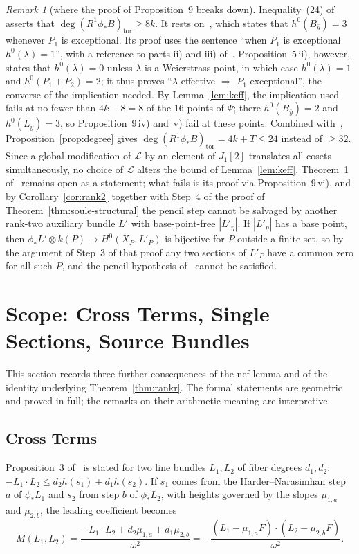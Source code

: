 \documentclass[11pt]{article}
\theoremstyle{definition}
\theoremstyle{remark}
\newtheorem{remark}[theorem]{Remark}
\newcommand{\cL}{\mathcal{L}}
\newcommand{\Lb}{\overline{L}}
\begin{document}
\begin{remark}[where the proof of Proposition~9 breaks down]\label{rem:gap}
Inequality~(24) of~\cite{So26} asserts that
$\deg(R^1\phi_*B)_{\mathrm{tor}}\ge 8k$. It rests on~\cite[Prop.~9\,iv)]{So26},
which states that $h^0(B_{\bar y})=3$ whenever $P_1$ is exceptional.
Its proof uses the sentence ``when $P_1$ is exceptional $h^0(\lambda)=1$'', with
a reference to parts ii) and iii) of~\cite[Prop.~5]{So26}. Proposition~5\,ii),
however, states that $h^0(\lambda)=0$ unless $\lambda$ is a Weierstrass point, in
which case $h^0(\lambda)=1$ and $h^0(P_1+P_2)=2$; it thus proves ``$\lambda$
effective $\Rightarrow$ $P_1$ exceptional'', the converse of the implication
needed. By Lemma~\ref{lem:keff}, the implication used fails at no fewer than
$4k-8=8$ of the $16$ points of $\Psi$; there $h^0(B_{\bar y})=2$ and
$h^0(L_{\bar y})=3$, so Proposition~9\,iv) and~v) fail at these points. Combined
with~\cite[(16), (18), (22)]{So26}, Proposition~\ref{prop:degree} gives
$\deg(R^1\phi_*B)_{\mathrm{tor}}=4k+T\le 24$ instead of $\ge 32$. Since a global
modification of $\cL$ by an element of $J_1[2]$ translates all cosets
simultaneously, no choice of $\cL$ alters the bound of Lemma~\ref{lem:keff}.
Theorem~1 of~\cite{So26} remains open as a statement; what fails is its proof via
Proposition~9\,vi), and by Corollary~\ref{cor:rank2} together with Step~4 of the
proof of Theorem~\ref{thm:soule-structural} the pencil step cannot be salvaged by
another rank-two auxiliary bundle $L'$ with base-point-free $|L'_\eta|$. If
$|L'_\eta|$ has a base point, then $\phi_*L'\otimes k(P)\to H^0(X_P,L'_P)$ is
bijective for $P$ outside a finite set, so by the argument of Step~3 of that proof
any two sections of $L'_P$ have a common zero for all such $P$, and the pencil
hypothesis of~\cite[(28)]{So26} cannot be satisfied.
\end{remark}

\section{Scope: Cross Terms, Single Sections, Source Bundles}\label{sec:scope}

This section records three further consequences of the nef lemma and of the
identity underlying Theorem~\ref{thm:rankr}. The formal statements are geometric
and proved in full; the remarks on their arithmetic meaning are interpretive.

\subsection{Cross Terms}
Proposition~3 of~\cite{So26} is stated for two line bundles $L_1,L_2$ of fiber
degrees $d_1,d_2$: $-\Lb_1\cdot\Lb_2\le d_2h(s_1)+d_1h(s_2)$. If $s_1$ comes from
the Harder--Narasimhan step $a$ of $\phi_*L_1$ and $s_2$ from step $b$ of
$\phi_*L_2$, with heights governed by the slopes $\mu_{1,a}$ and $\mu_{2,b}$, the
leading coefficient becomes
\[
M(L_1,L_2)=\frac{-L_1\cdot L_2+d_2\mu_{1,a}+d_1\mu_{2,b}}{\omega^2}
=-\frac{(L_1-\mu_{1,a}F)\cdot(L_2-\mu_{2,b}F)}{\omega^2}.
\]
\end{document}
